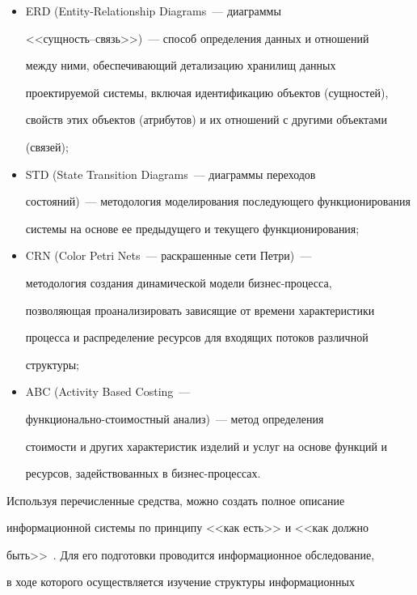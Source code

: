 \begin{itemize}
       \item ERD (Entity-Relationship Diagrams~--- диаграммы 


       <<сущность--связь>>)~--- способ определения данных и отношений 


между ними, обеспечивающий детализацию хранилищ данных 


проектируемой системы, включая идентификацию объектов (сущностей), 


свойств этих объектов (атрибутов) и их отношений с другими объектами 


(связей); 


       \item STD (State Transition Diagrams~--- диаграммы переходов 


состояний)~--- методология моделирования последующего функционирования 


системы на основе ее предыдущего и текущего функционирования; 


       \item CRN (Color Petri   Nets~--- раскрашенные сети Петри)~--- 


методология создания динамической модели биз\-нес-про\-цес\-са, 


позволяющая проанализировать зависящие от времени характеристики 


процесса и распределение ресурсов для входящих потоков различной 


структуры; 


       \item ABC (Activity Based Costing~--- 


       функ\-ци\-о\-наль\-но-сто\-и\-мост\-ный анализ)~--- метод определения 


стоимости и других характеристик изделий и услуг на основе функций и 


ресурсов, задействованных в биз\-нес-про\-цессах. 


       \end{itemize}


       


       Используя перечисленные средства, можно создать полное описание 


информационной системы по принципу <<как есть>> и <<как должно 


быть>>~\cite{7-2-4}. Для его подготовки проводится информационное обследование, 


в ходе которого осуществляется изучение структуры информационных 


